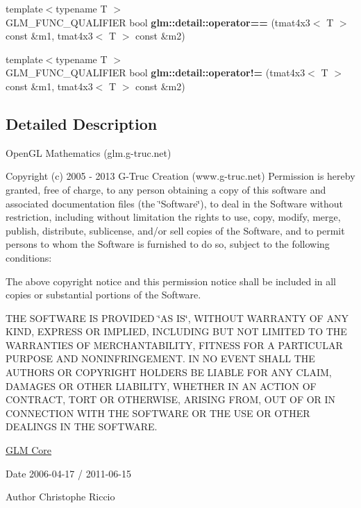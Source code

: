 \begin{DoxyCompactItemize}
\item 
\hypertarget{namespaceglm_1_1detail_a2a4ee64a78ceb64b6ad84b7bd5f7fc1f}{}{\footnotesize template$<$typename T $>$ }\\G\+L\+M\+\_\+\+F\+U\+N\+C\+\_\+\+Q\+U\+A\+L\+I\+F\+I\+E\+R bool {\bfseries glm\+::detail\+::operator==} (tmat4x3$<$ T $>$ const \&m1, tmat4x3$<$ T $>$ const \&m2)\label{namespaceglm_1_1detail_a2a4ee64a78ceb64b6ad84b7bd5f7fc1f}

\item 
\hypertarget{namespaceglm_1_1detail_aa2f6f4a87ab8f09da032bfa19b12c817}{}{\footnotesize template$<$typename T $>$ }\\G\+L\+M\+\_\+\+F\+U\+N\+C\+\_\+\+Q\+U\+A\+L\+I\+F\+I\+E\+R bool {\bfseries glm\+::detail\+::operator!=} (tmat4x3$<$ T $>$ const \&m1, tmat4x3$<$ T $>$ const \&m2)\label{namespaceglm_1_1detail_aa2f6f4a87ab8f09da032bfa19b12c817}

\end{DoxyCompactItemize}


\subsection{Detailed Description}
Open\+G\+L Mathematics (glm.\+g-\/truc.\+net)

Copyright (c) 2005 -\/ 2013 G-\/\+Truc Creation (www.\+g-\/truc.\+net) Permission is hereby granted, free of charge, to any person obtaining a copy of this software and associated documentation files (the \char`\"{}\+Software\char`\"{}), to deal in the Software without restriction, including without limitation the rights to use, copy, modify, merge, publish, distribute, sublicense, and/or sell copies of the Software, and to permit persons to whom the Software is furnished to do so, subject to the following conditions\+:

The above copyright notice and this permission notice shall be included in all copies or substantial portions of the Software.

T\+H\+E S\+O\+F\+T\+W\+A\+R\+E I\+S P\+R\+O\+V\+I\+D\+E\+D \char`\"{}\+A\+S I\+S\char`\"{}, W\+I\+T\+H\+O\+U\+T W\+A\+R\+R\+A\+N\+T\+Y O\+F A\+N\+Y K\+I\+N\+D, E\+X\+P\+R\+E\+S\+S O\+R I\+M\+P\+L\+I\+E\+D, I\+N\+C\+L\+U\+D\+I\+N\+G B\+U\+T N\+O\+T L\+I\+M\+I\+T\+E\+D T\+O T\+H\+E W\+A\+R\+R\+A\+N\+T\+I\+E\+S O\+F M\+E\+R\+C\+H\+A\+N\+T\+A\+B\+I\+L\+I\+T\+Y, F\+I\+T\+N\+E\+S\+S F\+O\+R A P\+A\+R\+T\+I\+C\+U\+L\+A\+R P\+U\+R\+P\+O\+S\+E A\+N\+D N\+O\+N\+I\+N\+F\+R\+I\+N\+G\+E\+M\+E\+N\+T. I\+N N\+O E\+V\+E\+N\+T S\+H\+A\+L\+L T\+H\+E A\+U\+T\+H\+O\+R\+S O\+R C\+O\+P\+Y\+R\+I\+G\+H\+T H\+O\+L\+D\+E\+R\+S B\+E L\+I\+A\+B\+L\+E F\+O\+R A\+N\+Y C\+L\+A\+I\+M, D\+A\+M\+A\+G\+E\+S O\+R O\+T\+H\+E\+R L\+I\+A\+B\+I\+L\+I\+T\+Y, W\+H\+E\+T\+H\+E\+R I\+N A\+N A\+C\+T\+I\+O\+N O\+F C\+O\+N\+T\+R\+A\+C\+T, T\+O\+R\+T O\+R O\+T\+H\+E\+R\+W\+I\+S\+E, A\+R\+I\+S\+I\+N\+G F\+R\+O\+M, O\+U\+T O\+F O\+R I\+N C\+O\+N\+N\+E\+C\+T\+I\+O\+N W\+I\+T\+H T\+H\+E S\+O\+F\+T\+W\+A\+R\+E O\+R T\+H\+E U\+S\+E O\+R O\+T\+H\+E\+R D\+E\+A\+L\+I\+N\+G\+S I\+N T\+H\+E S\+O\+F\+T\+W\+A\+R\+E.

\hyperlink{group__core}{G\+L\+M Core}

\begin{DoxyDate}{Date}
2006-\/04-\/17 / 2011-\/06-\/15 
\end{DoxyDate}
\begin{DoxyAuthor}{Author}
Christophe Riccio 
\end{DoxyAuthor}
